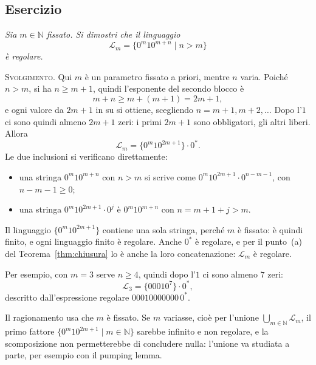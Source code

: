 \documentclass[a4paper, 11pt, oneside]{book}
\makeatletter
\theoremstyle{formale}
\newcommand{\spaziominimo}[1]{%
    \par
    \if@nobreak\else
        \ifdim\pagegoal<\maxdimen
            \ifdim\dimexpr\pagegoal-\pagetotal\relax<#1\relax
                \ifdim\pagetotal>\pagegoal\else
                    \newpage
                \fi
            \fi
        \fi
    \fi}
\newcounter{escount}[section]
\newcommand{\esercizio}{
    \spaziominimo{8\baselineskip}%
    \refstepcounter{escount}%
    \subsection*{Esercizio \arabic{escount}}%
}
\makeatother
\begin{document}
    \esercizio
    \textit{Sia $m \in \mathbb{N}$ fissato. Si dimostri che il linguaggio
    \begin{equation*}
        \mathcal{L}_m = \{0^m 1 0^{m+n} \mid n > m\}
    \end{equation*}
    \`e regolare.}

    \textsc{Svolgimento}. Qui $m$ \`e un parametro fissato a priori, mentre $n$ varia.
    Poich\'e $n > m$, si ha $n \geq m + 1$, quindi l'esponente del secondo blocco \`e
    \begin{equation*}
        m + n \geq m + (m + 1) = 2m + 1,
    \end{equation*}
    e ogni valore da $2m + 1$ in su si ottiene, scegliendo $n = m + 1, m + 2, \dots$ Dopo
    l'$1$ ci sono quindi almeno $2m + 1$ zeri: i primi $2m + 1$ sono obbligatori, gli
    altri liberi. Allora
    \begin{equation*}
        \mathcal{L}_m = \{0^m 1 0^{2m+1}\} \cdot 0^*.
    \end{equation*}
    Le due inclusioni si verificano direttamente:
    \begin{itemize}
        \item[($\subseteq$)] una stringa $0^m 1 0^{m+n}$ con $n > m$ si scrive come
            $0^m 1 0^{2m+1} \cdot 0^{n-m-1}$, con $n - m - 1 \geq 0$;
        \item[($\supseteq$)] una stringa $0^m 1 0^{2m+1} \cdot 0^j$ \`e
            $0^m 1 0^{m+n}$ con $n = m + 1 + j > m$.
    \end{itemize}
    Il linguaggio $\{0^m 1 0^{2m+1}\}$ contiene una sola stringa, perch\'e $m$ \`e
    fissato: \`e quindi finito, e ogni linguaggio finito \`e regolare. Anche $0^*$ \`e
    regolare, e per il punto~(a) del Teorema~\ref{thm:chiusura} lo \`e anche la loro
    concatenazione: $\mathcal{L}_m$ \`e regolare.

    Per esempio, con $m = 3$ serve $n \geq 4$, quindi dopo l'$1$ ci sono almeno $7$ zeri:
    \begin{equation*}
        \mathcal{L}_3 = \{0001 0^7\} \cdot 0^*,
    \end{equation*}
    descritto dall'espressione regolare $00010000000\,0^*$.

    Il ragionamento usa che $m$ \`e fissato. Se $m$ variasse, cio\`e per l'unione
    $\bigcup_{m \in \mathbb{N}} \mathcal{L}_m$, il primo fattore
    $\{0^m 1 0^{2m+1} \mid m \in \mathbb{N}\}$ sarebbe infinito e non regolare, e la
    scomposizione non permetterebbe di concludere nulla: l'unione va studiata a parte, per
    esempio con il pumping lemma.
\end{document}
